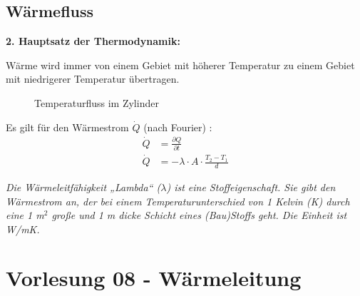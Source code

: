\documentclass[a4paper,10pt,twoside]{article}
\begin{document}
\subsection{Wärmefluss}
\pp
\textbf{2. Hauptsatz der Thermodynamik:}\par 
Wärme wird immer von einem Gebiet mit höherer Temperatur zu einem Gebiet mit niedrigerer Temperatur übertragen. 
\begin{figure}[h]
\centering
{}
\caption{Temperaturfluss im Zylinder}

\end{figure}

Es gilt für den Wärmestrom $\dot{Q}$ (nach Fourier) :
\begin{align*}
\dot{Q} &= \frac{\partial Q}{\partial t} \\
\dot{Q}	&= - \lambda \cdot A \cdot \frac{T_2-T_1}{d}
\end{align*}

\pp
\footnotesize
\textit{Die Wärmeleitfähigkeit „Lambda“ ($\lambda$) ist eine Stoffeigenschaft. Sie gibt den Wärmestrom an, der bei einem Temperaturunterschied von 1 Kelvin (K) durch eine 1 m$^2$ große und 1 m dicke Schicht eines (Bau)Stoffs geht. Die Einheit ist W/mK.}
\
\normalsize
\ppbig
{}
\pagebreak
\section*{Vorlesung 08 - Wärmeleitung}\addtocounter{section}{1}
\end{document}
